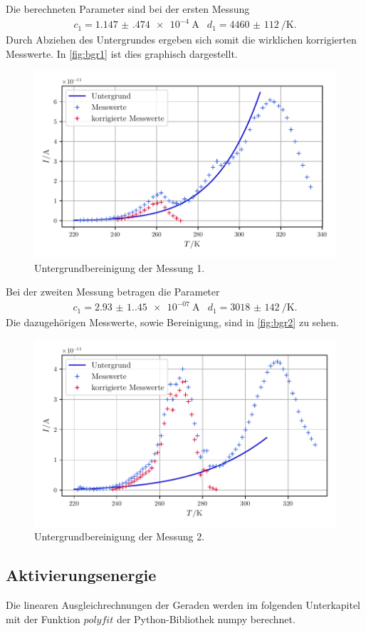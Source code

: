 Die berechneten Parameter sind bei der ersten Messung
\begin{align}
    c_1 = \qty{1.147(474)e-4}{\ampere} & d_1 = \qty{4460(112)}{\per\kelvin}.
\end{align}
Durch Abziehen des Untergrundes ergeben sich somit die wirklichen korrigierten Messwerte.
In \autoref{fig:bgr1} ist dies graphisch dargestellt.
\begin{figure}
    \centering
    \includegraphics[width=0.8\linewidth]{scripts/build/plot1_bgr.pdf}
    \caption{Untergrundbereinigung der Messung 1.}
    \label{fig:bgr1}
\end{figure}

Bei der zweiten Messung betragen die Parameter
\begin{align}
    c_1 = \qty{2.93(1.45)e-07}{\ampere} & d_1 = \qty{3018(142)}{\per\kelvin}.
\end{align}
Die dazugehörigen Messwerte, sowie Bereinigung, sind in \autoref{fig:bgr2} zu sehen.
\begin{figure}
    \centering
    \includegraphics[width=0.8\linewidth]{scripts/build/plot2_bgr.pdf}
    \caption{Untergrundbereinigung der Messung 2.}
    \label{fig:bgr2}
\end{figure}

\subsection{Aktivierungsenergie}
Die linearen Ausgleichrechnungen der Geraden werden im folgenden Unterkapitel mit der Funktion $polyfit$ der Python-Bibliothek numpy\cite{numpy} berechnet.
